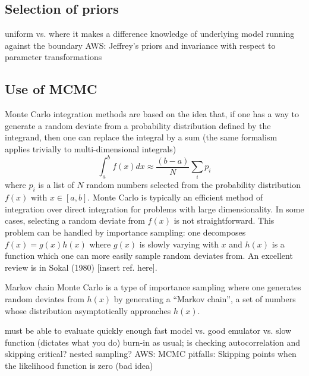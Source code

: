 \subsection{Selection of priors}  \label{subsec:selecting_priors}

  \bi
    \I uniform vs. where it makes a difference
    \I knowledge of underlying model 
    \I running against the boundary
    \I AWS: Jeffrey's priors and invariance with respect to
    parameter transformations
  \ei


\subsection{Use of MCMC}  \label{subsec:using_mcmc}

Monte Carlo integration methods are based on the idea that, if one
has a way to generate a random deviate from a probability distribution
defined by the integrand, then one can replace the integral by a sum
(the same formalism applies trivially to multi-dimensional integrals)
\begin{equation}
  \int_a^{b} f(x) dx \approx \frac{\left( b-a\right)}{N} \sum_i p_i 
\end{equation}
where $p_i$ is a list of $N$ random numbers selected from the
probability distribution $f(x)$ with $x \in [a,b]$. Monte
Carlo is typically an efficient method of integration
over direct integration for
problems with large dimensionality. In some cases,
selecting a random deviate from $f(x)$ is not straightforward.
This problem can be handled by importance sampling: one decomposes
$f(x)=g(x)h(x)$ where $g(x)$ is slowly varying with $x$ and $h(x)$
is a function which one can more easily sample random deviates from.
An excellent review is in Sokal (1980) [insert ref. here].

Markov chain Monte Carlo is a type of
importance sampling where one generates random deviates from $h(x)$
by generating a ``Markov chain'', a set of numbers whose distribution
asymptotically approaches $h(x)$.

  \bi
    \I must be able to evaluate quickly enough
    \I fast model vs. good emulator vs. slow function (dictates what you do)
    \I burn-in as usual; is checking autocorrelation and skipping critical?
    \I nested sampling?
    \I AWS: MCMC pitfalls: Skipping points when the likelihood
    function is zero (bad idea)
  \ei



